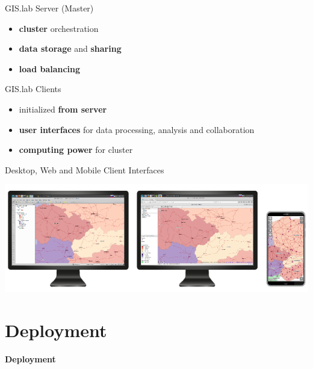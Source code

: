 \documentclass[12pt]{beamer}
\begin{document}
\begin{frame}{GIS.lab Server (Master)}
	\begin{itemize}
		\item \textbf{cluster} orchestration
		\item \textbf{data storage} and \textbf{sharing}
		\item \textbf{load balancing}
	\end{itemize}
\end{frame}

\begin{frame}{GIS.lab Clients}
	\begin{itemize}
		\item initialized \textbf{from server}
		\item \textbf{user interfaces} for data processing, analysis and collaboration
		\item \textbf{computing power} for cluster
	\end{itemize}
\end{frame}

\begin{frame}{Desktop, Web and Mobile Client Interfaces}
	\begin{center}
		\includegraphics[keepaspectratio=true,height=0.5\textheight]{images/gislab-desktop-web-mobile.png}
	\end{center}
\end{frame}


\section{Deployment}
\begin{frame}
	\begin{center}
		\LARGE\textbf{Deployment}	
	\end{center}
\end{frame}
\end{document}
